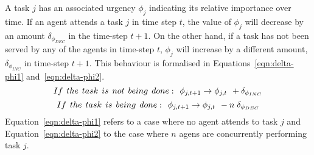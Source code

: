 \documentclass[journal]{IEEEtran}
\begin{document}
A task $j$ has an associated urgency $\phi_j$ indicating its relative importance over time.  If an agent attends a task $j$ in time step $t$, the value of $\phi_j$ will decrease by an amount $\delta_{\phi_{DEC}}$ in the time-step $t+1$.  On the other hand, if a task has not been served by any of the agents in time-step $t$, $\phi_j$ will increase by a different amount, $\delta_{\phi_{INC}}$ in time-step $t+1$.  This behaviour is formalised in Equations~\ref{eqn:delta-phi1} and~\ref{eqn:delta-phi2}.
\begin{equation}
 If\hspace*{0.15cm}the\hspace*{0.15cm} task\hspace*{0.15cm}is\hspace*{0.15cm}not\hspace*{0.15cm}being\hspace*{0.15cm} done:\hspace*{0.15cm} \phi_{j,t+1} \rightarrow \phi_{j,t} \hspace*{0.15cm} + \delta_{\phi_{INC}}
\label{eqn:delta-phi1}
\end{equation}
\begin{equation}
 If\hspace*{0.15cm}the \hspace*{0.15cm}task\hspace*{0.15cm}is\hspace*{0.15cm}being\hspace*{0.15cm}done:\hspace*{0.15cm}  \phi_{j,t+1} \rightarrow \phi_{j,t} \hspace*{0.15cm} - n\hspace*{0.10cm}\delta_{\phi_{DEC}}
\label{eqn:delta-phi2}
\end{equation}
Equation~\ref{eqn:delta-phi1} refers to a case where no agent attends to task $j$ and Equation~\ref{eqn:delta-phi2} to the case where $n$ agens are concurrently performing task $j$.
\end{document}
